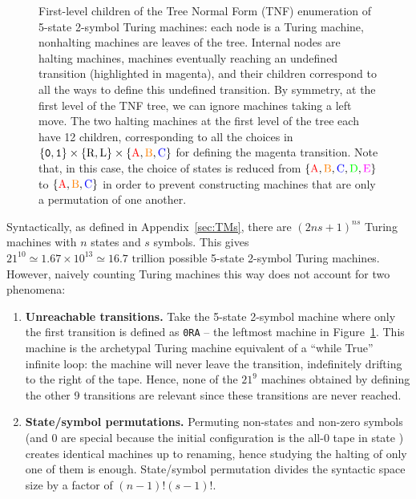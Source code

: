 \begin{figure}[ht]
{\begin{tikzpicture}
        \end{tikzpicture}
    }
    \caption{First-level children of the Tree Normal Form (TNF) enumeration of 5-state 2-symbol Turing machines: each node is a Turing machine, nonhalting machines are leaves of the tree. Internal nodes are halting machines, \ie machines eventually reaching an undefined transition (highlighted in magenta), and their children correspond to all the ways to define this undefined transition. By symmetry, at the first level of the TNF tree, we can ignore machines taking a left move. The two halting machines at the first level of the tree each have 12 children, corresponding to all the choices in $\{\szero,\sone\}\times\{\text{R},\text{L}\}\times\{\text{\stateA},\text{\stateB},\text{\stateC}\}$ for defining the magenta transition. Note that, in this case, the choice of states is reduced from $\{\text{\stateA},\text{\stateB},\text{\stateC},\text{\stateD},\text{\stateE}\}$ to $\{\text{\stateA},\text{\stateB},\text{\stateC}\}$ in order to prevent constructing machines that are only a permutation of one another.}\label{fig:TNF}
\end{figure}



Syntactically, as defined in Appendix~\ref{sec:TMs}, there are $(2ns + 1)^{ns}$ Turing machines with $n$ states and $s$ symbols. This gives $21^{10} \simeq 1.67\times10^{13} \simeq 16.7 \text{ trillion}$ possible 5-state 2-symbol Turing machines. However, naively counting Turing machines this way does not account for two phenomena:
\begin{enumerate}
    \item \textbf{Unreachable transitions.} Take the 5-state 2-symbol machine where only the first transition is defined as \texttt{0RA} -- the leftmost machine in Figure~\ref{fig:TNF}. This machine is the archetypal Turing machine equivalent of a ``while True'' infinite loop: the machine will never leave the transition, indefinitely drifting to the right of the tape. Hence, none of the $21^9$ machines obtained by defining the other 9 transitions are relevant since these transitions are never reached.
    \item \textbf{State/symbol permutations.} Permuting non-\stateA states and non-zero symbols (\stateA and 0 are special because the initial configuration is the all-0 tape in state \stateA) creates identical machines up to renaming, hence studying the halting of only one of them is enough. State/symbol permutation divides the syntactic space size by a factor of $(n-1)! (s-1)!$.
\end{enumerate}

